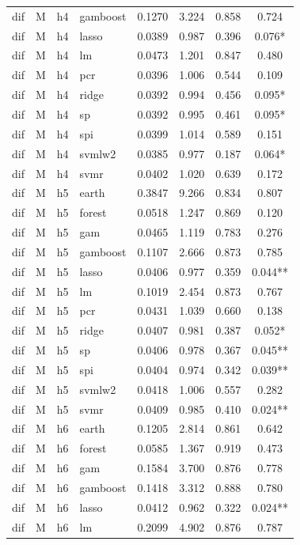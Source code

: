 \begin{ThreePartTable}
\begin{longtable}[t]{llclcccc}
dif & M & h4 & gamboost & 0.1270 & 3.224 & 0.858 & 0.724\\
dif & M & h4 & lasso & 0.0389 & 0.987 & 0.396 & 0.076*\\
dif & M & h4 & lm & 0.0473 & 1.201 & 0.847 & 0.480\\
dif & M & h4 & pcr & 0.0396 & 1.006 & 0.544 & 0.109\\
dif & M & h4 & ridge & 0.0392 & 0.994 & 0.456 & 0.095*\\
dif & M & h4 & sp & 0.0392 & 0.995 & 0.461 & 0.095*\\
dif & M & h4 & spi & 0.0399 & 1.014 & 0.589 & 0.151\\
dif & M & h4 & svmlw2 & 0.0385 & 0.977 & 0.187 & 0.064*\\
dif & M & h4 & svmr & 0.0402 & 1.020 & 0.639 & 0.172\\
\addlinespace
dif & M & h5 & earth & 0.3847 & 9.266 & 0.834 & 0.807\\
dif & M & h5 & forest & 0.0518 & 1.247 & 0.869 & 0.120\\
dif & M & h5 & gam & 0.0465 & 1.119 & 0.783 & 0.276\\
dif & M & h5 & gamboost & 0.1107 & 2.666 & 0.873 & 0.785\\
dif & M & h5 & lasso & 0.0406 & 0.977 & 0.359 & 0.044**\\
dif & M & h5 & lm & 0.1019 & 2.454 & 0.873 & 0.767\\
dif & M & h5 & pcr & 0.0431 & 1.039 & 0.660 & 0.138\\
dif & M & h5 & ridge & 0.0407 & 0.981 & 0.387 & 0.052*\\
dif & M & h5 & sp & 0.0406 & 0.978 & 0.367 & 0.045**\\
dif & M & h5 & spi & 0.0404 & 0.974 & 0.342 & 0.039**\\
dif & M & h5 & svmlw2 & 0.0418 & 1.006 & 0.557 & 0.282\\
dif & M & h5 & svmr & 0.0409 & 0.985 & 0.410 & 0.024**\\
\addlinespace
dif & M & h6 & earth & 0.1205 & 2.814 & 0.861 & 0.642\\
dif & M & h6 & forest & 0.0585 & 1.367 & 0.919 & 0.473\\
dif & M & h6 & gam & 0.1584 & 3.700 & 0.876 & 0.778\\
dif & M & h6 & gamboost & 0.1418 & 3.312 & 0.888 & 0.780\\
dif & M & h6 & lasso & 0.0412 & 0.962 & 0.322 & 0.024**\\
dif & M & h6 & lm & 0.2099 & 4.902 & 0.876 & 0.787\\

\end{longtable}
\end{ThreePartTable}
